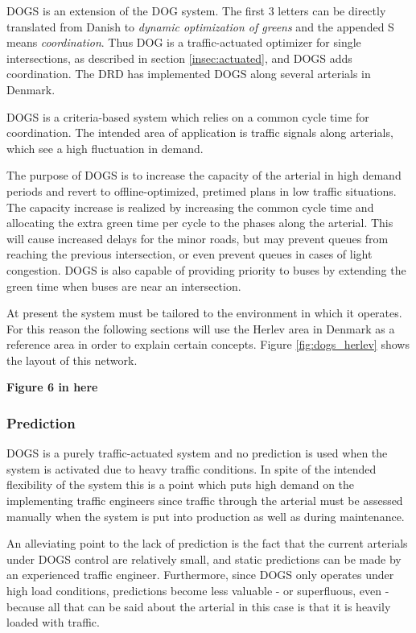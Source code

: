 \label{sec:dogs}

DOGS is an extension of the DOG system. The first 3 letters can be
directly translated from Danish to \textit{dynamic optimization of
greens} and the appended S means
\textit{coordination}. Thus DOG is a traffic-actuated optimizer for
single intersections, as described in section \ref{insec:actuated},
and DOGS adds coordination. The DRD has implemented DOGS along several
arterials in Denmark.

DOGS is a criteria-based system which relies on a common cycle time
for coordination. The intended area of application is traffic signals
along arterials, which see a high fluctuation in demand.

The purpose of DOGS is to increase the capacity of the arterial in
high demand periods and revert to offline-optimized, pretimed plans in
low traffic situations. The capacity increase is realized by
increasing the common cycle time and allocating the extra green time per
cycle to the phases along the arterial. This will cause increased
delays for the minor roads, but may prevent queues from reaching the
previous intersection, or even prevent queues in cases of light
congestion.  DOGS is also capable of providing priority to buses by
extending the green time when buses are near an intersection.

At present the system must be tailored to the environment in which it
operates. For this reason the following sections will use the Herlev
area in Denmark as a reference area in order to explain certain
concepts. Figure \ref{fig:dogs_herlev} shows the layout of this
network.

\begin{center}
{\bf Figure 6 in here}
\end{center}

\subsubsection*{Prediction}

DOGS is a purely traffic-actuated system and no prediction is used
when the system is activated due to heavy traffic conditions.  In
spite of the intended flexibility of the system this is a point which
puts high demand on the implementing traffic engineers since traffic
through the arterial must be assessed manually when the system is put
into production as well as during maintenance.

An alleviating point to the lack of prediction is the fact that the
current arterials under DOGS control are relatively small, and static
predictions can be made by an experienced traffic
engineer. Furthermore, since DOGS only operates under high load
conditions, predictions become less valuable - or superfluous, even -
because all that can be said about the arterial in this case is that
it is heavily loaded with traffic.

